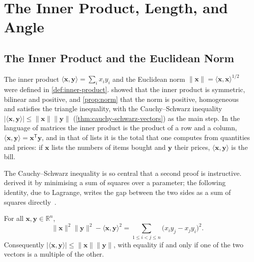 \section{The Inner Product, Length, and Angle}
\label{sec:inner-product-length}

\subsection{The Inner Product and the Euclidean Norm}

The inner product $\langle\mathbf x,\mathbf y\rangle=\sum_ix_iy_i$ and the Euclidean norm $\|\mathbf x\|=\langle\mathbf x,\mathbf x\rangle^{1/2}$ were defined in \cref{def:inner-product}.  showed that the inner product is symmetric, bilinear and positive, and \cref{prop:norm} that the norm is positive, homogeneous and satisfies the triangle inequality, with the Cauchy--Schwarz inequality $|\langle\mathbf x,\mathbf y\rangle|\le\|\mathbf x\|\|\mathbf y\|$ (\cref{thm:cauchy-schwarz-vectors}) as the main step. In the language of matrices the inner product is the product of a row and a column, $\langle\mathbf x,\mathbf y\rangle=\mathbf x^{\mathsf T}\mathbf y$, and in that of lists it is the total that one computes from quantities and prices: if $\mathbf x$ lists the numbers of items bought and $\mathbf y$ their prices, $\langle\mathbf x,\mathbf y\rangle$ is the bill.

The Cauchy--Schwarz inequality is so central that a second proof is instructive.  derived it by minimising a sum of squares over a parameter; the following identity, due to Lagrange, writes the gap between the two sides as a sum of squares directly~\cite[Chap.~1]{steele2004}.

\begin{proposition}
\label{prop:lagrange-identity}
For all $\mathbf x,\mathbf y\in\mathbb R^n$,
\[
\|\mathbf x\|^2\|\mathbf y\|^2-\langle\mathbf x,\mathbf y\rangle^2=\sum_{1\le i<j\le n}\bigl(x_iy_j-x_jy_i\bigr)^2 .
\]
Consequently $|\langle\mathbf x,\mathbf y\rangle|\le\|\mathbf x\|\|\mathbf y\|$, with equality if and only if one of the two vectors is a multiple of the other.
\end{proposition}

